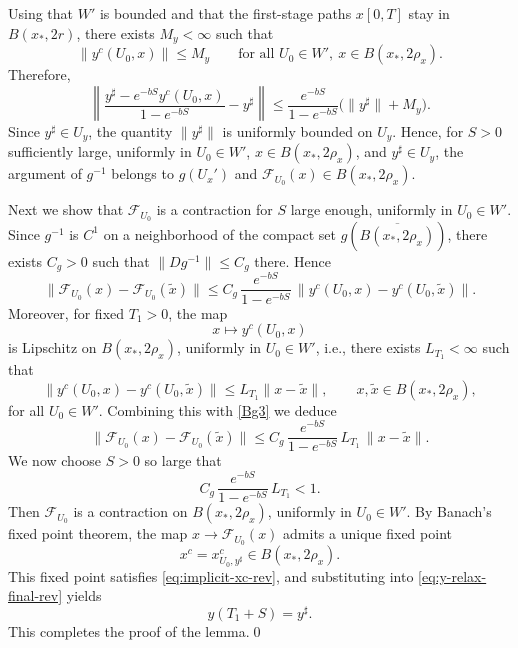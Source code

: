 \documentclass[11pt, a4paper,leqno]{amsart}
\theoremstyle{definition}
\numberwithin{equation}{section}
\begin{document}
Using that \(W'\) is bounded and that the first-stage paths $x[0,T]$ stay in \(B(x_\ast,2r)\), there exists \(M_y<\infty\) such that
\[
\|y^c(U_0,x)\|\le M_y
\qquad
\text{for all }U_0\in W',\ x\in B(x_\ast,2\rho_x).
\]
Therefore,
\[
\left\|
\frac{y^\sharp-e^{-bS}y^c(U_0,x)}{1-e^{-bS}}
-y^\sharp
\right\|
\le
\frac{e^{-bS}}{1-e^{-bS}}\bigl(\|y^\sharp\|+M_y\bigr).
\]
Since \(y^\sharp\in U_y\), the quantity \(\|y^\sharp\|\) is uniformly bounded on
\(U_y\). Hence, for \(S>0\) sufficiently large, uniformly in \(U_0\in W'\),
\(x\in B(x_\ast,2\rho_x)\), and \(y^\sharp\in U_y\), the argument of \(g^{-1}\)
belongs to \(g(U_x')\) and \(\mathcal F_{U_0}(x)\in B(x_\ast,2\rho_x)\).

Next we show that \(\mathcal F_{U_0}\) is a contraction for \(S\) large enough,
uniformly in \(U_0\in W'\). Since \(g^{-1}\) is \(C^1\) on a neighborhood of the
compact set \(g(\overline{B(x_\ast,2\rho_x)})\), there exists \(C_g>0\) such
that $\|Dg^{-1}\|\le C_g$ there. Hence
\begin{equation}\label{Bg3}
\|\mathcal F_{U_0}(x)-\mathcal F_{U_0}(\tilde x)\|
\le
C_g\,\frac{e^{-bS}}{1-e^{-bS}}\,
\|y^c(U_0,x)-y^c(U_0,\tilde x)\|.
\end{equation}
Moreover, for fixed \(T_1>0\), the map
\[
x\mapsto y^c(U_0,x)
\]
is Lipschitz on \(B(x_\ast,2\rho_x)\), uniformly in \(U_0\in W'\), i.e., there exists
\(L_{T_1}<\infty\) such that
\[
\|y^c(U_0,x)-y^c(U_0,\tilde x)\|
\le
L_{T_1}\|x-\tilde x\|,
\qquad
x,\tilde x\in B(x_\ast,2\rho_x),
\]
for all \(U_0\in W'\). Combining this with \eqref{Bg3} we deduce
\[
\|\mathcal F_{U_0}(x)-\mathcal F_{U_0}(\tilde x)\|
\le
C_g\,\frac{e^{-bS}}{1-e^{-bS}}\,L_{T_1}\,\|x-\tilde x\|.
\]
We now choose \(S>0\) so large that
\[
C_g\,\frac{e^{-bS}}{1-e^{-bS}}\,L_{T_1}<1.
\]
Then \(\mathcal F_{U_0}\) is a contraction on \(B(x_\ast,2\rho_x)\), uniformly in
\(U_0\in W'\). By Banach's fixed point theorem, the map $x\to \mathcal F_{U_0}(x)$ admits a unique fixed point
\[
x^c=x^c_{U_0,y^\sharp}\in B(x_\ast,2\rho_x).
\]
This fixed point satisfies \eqref{eq:implicit-xc-rev}, and substituting into
\eqref{eq:y-relax-final-rev} yields
\[
y(T_1+S)=y^\sharp.
\]
This completes the proof of the lemma.\qed
\end{document}
